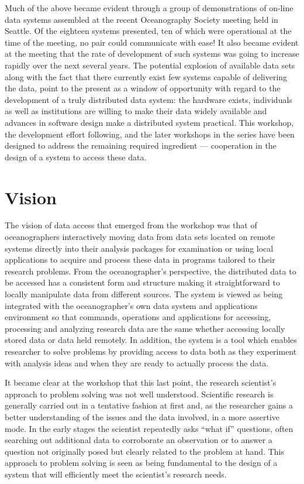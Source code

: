 Much of the above became evident through a group of demonstrations 
of on-line data systems assembled at the recent Oceanography Society 
meeting held in Seattle. Of the eighteen systems presented, ten of 
which were operational at the time of the meeting, no pair could 
communicate with ease! It also became evident at the meeting that the 
rate of development of such systems was going to increase rapidly over 
the next several years. The potential explosion of available 
data sets along with the fact that there currently exist few systems 
capable of delivering the data, point to the present as a window of 
opportunity with regard to the development of a truly distributed 
data system: the hardware exists, individuals as well as institutions 
are willing to make their data widely available and advances in software 
design make a distributed system practical. This workshop, the
development effort following, and the later workshops in the series
have been designed to address the remaining required ingredient --- 
cooperation in the design of a system to access these data.

\section{\bf Vision}

The vision of data access that emerged from the workshop was that of
oceanographers interactively moving data from data sets located on remote
systems directly into their analysis packages for examination or using local
applications to acquire and process these data in programs tailored to their 
research problems.  From the oceanographer's perspective, the distributed data
to be accessed has a consistent form and structure making it straightforward 
to locally manipulate data from different sources.  The system is viewed
as being integrated with the oceanographer's own data system and applications
environment so that commands, operations and applications for accessing,
processing and analyzing research data are the same whether accessing 
locally stored data or data held remotely.  In addition, the system is a tool
which enables researcher to solve problems by providing access to data both
as they experiment with analysis ideas and when they are ready to actually
process the data.

It became clear at the workshop that this last point, the research
scientist's approach to problem solving was not well understood.  Scientific
research is generally carried out in a tentative fashion at first and, as the
researcher gains a better understanding of the issues and the data involved,
in a more assertive mode.  In the early stages the scientist repeatedly asks
``what if'' questions, often searching out additional data to corroborate an
observation or to answer a question not originally posed but clearly related
to the problem at hand.  This approach to problem solving is seen as being
fundamental to the design of a system that will efficiently meet the
scientist's research needs.

